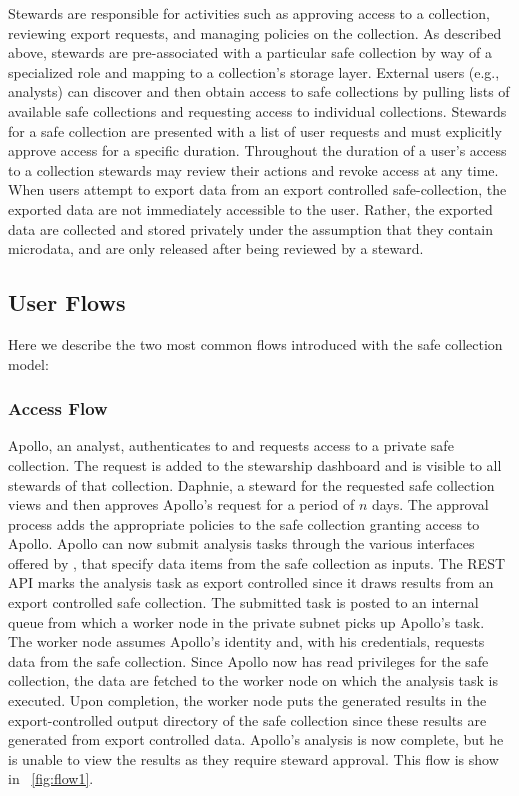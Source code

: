 Stewards are responsible for activities such as approving access to a collection, reviewing
export requests, and managing policies on the collection.
As described above, stewards are pre-associated with a particular safe collection by
way of a specialized role and mapping to a collection's storage layer.
External users (e.g., analysts) can discover
and then obtain access to safe collections by pulling lists of available safe collections and requesting
access to individual collections.
Stewards for a safe collection are presented with a list of user requests and must explicitly approve access
for a specific duration. Throughout the duration of a user's access to a collection
stewards may review their actions and revoke access at any time. When users attempt
to export data from an export controlled safe-collection, the exported data are not immediately
accessible to the user. Rather, the exported data are collected and stored privately under the assumption that they contain microdata, and are only released after being reviewed by a steward.


\subsection{User Flows}

Here we describe the two most common flows introduced with the safe collection model:

\subsubsection{Access Flow}

Apollo, an analyst, authenticates to \NAME and requests access to a private safe collection.
The request is added to the stewarship dashboard and is visible to all stewards
of that collection. Daphnie, a steward for the requested
safe collection views and then approves Apollo's request for a period of $n$ days.
The approval process adds the appropriate policies to the
safe collection granting access to Apollo. Apollo can now submit analysis tasks through the various
interfaces offered by \NAMENS, that specify data items from the safe collection as inputs.
The REST API marks the analysis task as export controlled since it draws results
from an export controlled safe collection.
The submitted task is posted to an internal queue from which a
worker node in the \NAME private subnet picks up Apollo's task. The worker node assumes Apollo's identity and, with
his credentials, requests data from the safe collection. Since Apollo now has read privileges for the
safe collection, the data are fetched to the worker node on which the analysis task is executed.
Upon completion, the worker node puts the generated results in the export-controlled
output directory of the safe collection since these results are generated from export controlled data.
Apollo's analysis is now complete, but he is unable to view the
results as they require steward approval. This flow is show in \figurename~\ref{fig:flow1}.

